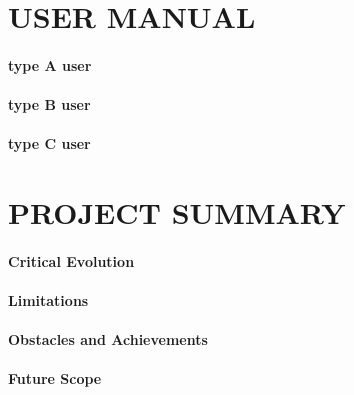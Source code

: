 \documentclass{article}
\begin{document}
\newpage
\section{USER MANUAL}
\paragraph{type A user}
\paragraph{type B user}
\paragraph{type C user}

\newpage
\section{PROJECT SUMMARY}
\paragraph{Critical Evolution}
\paragraph{Limitations}
\paragraph{Obstacles and Achievements}
\paragraph{Future Scope}
\end{document}
